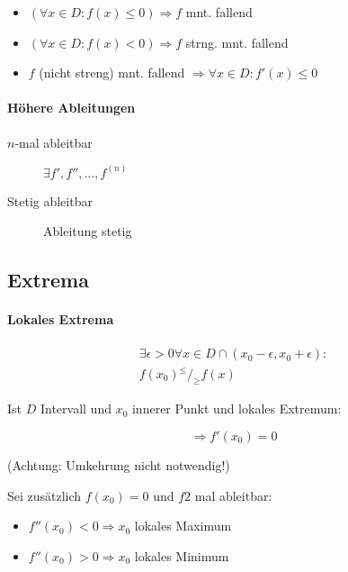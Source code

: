 \begin{itemize}
  \item $(\forall x \in D: f(x) \leq 0) \Rightarrow f$ mnt. fallend
  \item $(\forall x \in D: f(x) < 0) \Rightarrow f$ strng. mnt. fallend
  \item $f$ (nicht streng) mnt. fallend $\Rightarrow \forall x \in D: f'(x) \leq 0$
\end{itemize}

\paragraph{Höhere Ableitungen}

\begin{description}
  \item[$n$-mal ableitbar] $\exists f', f'', \dots, f^{(n)}$
  \item[Stetig ableitbar] Ableitung stetig
\end{description}

\subsection{Extrema}

\paragraph{Lokales Extrema}

\begin{gather*}
  \exists \epsilon > 0 \forall x \in D \cap (x_0 - \epsilon, x_0 + \epsilon):\\
  f(x_0) {}^{\leq}/_{\geq} f(x)
\end{gather*}

Ist $D$ Intervall und $x_0$ innerer Punkt und lokales Extremum:

$$\Rightarrow f'(x_0) = 0$$

(Achtung: Umkehrung nicht notwendig!)

Sei zusätzlich $f(x_0) = 0$ und $f 2$ mal ableitbar:

\begin{itemize}
  \item $f''(x_0) < 0 \Rightarrow x_0$ lokales Maximum
  \item $f''(x_0) > 0 \Rightarrow x_0$ lokales Minimum
\end{itemize}